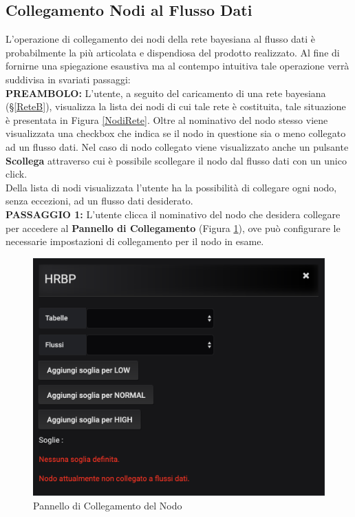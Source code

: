 \subsection{Collegamento Nodi al Flusso Dati}\label{Collegamento}

L'operazione di collegamento dei nodi della rete bayesiana al flusso dati è probabilmente la più articolata e dispendiosa del prodotto realizzato. Al fine di fornirne una spiegazione esaustiva ma al contempo intuitiva tale operazione verrà suddivisa in svariati passaggi:
~\\

\textbf{PREAMBOLO:} L'utente, a seguito del caricamento di una rete bayesiana (§\ref{ReteB}), visualizza la lista dei nodi di cui tale rete è costituita, tale situazione è presentata in Figura \ref{NodiRete}. Oltre al nominativo del nodo stesso viene visualizzata una checkbox che indica se il nodo in questione sia o meno collegato ad un flusso dati. Nel caso di nodo collegato viene visualizzato anche un pulsante \textbf{Scollega} attraverso cui è possibile scollegare il nodo dal flusso dati con un unico click.\\
Della lista di nodi visualizzata l'utente ha la possibilità di collegare ogni nodo, senza eccezioni, ad un flusso dati desiderato.
~\\

\textbf{PASSAGGIO 1:} L'utente clicca il nominativo del nodo che desidera collegare per accedere al \textbf{Pannello di Collegamento} (Figura \ref{PannelloNodo}), ove può configurare le necessarie impostazioni di collegamento per il nodo in esame.

\begin{figure}[H]
	\begin{center}
		\includegraphics[scale=0.6]{./images/PannelloNodo.png}
		 \caption{Pannello di Collegamento del Nodo}	
		 \label{PannelloNodo}
	\end{center}
\end{figure}

